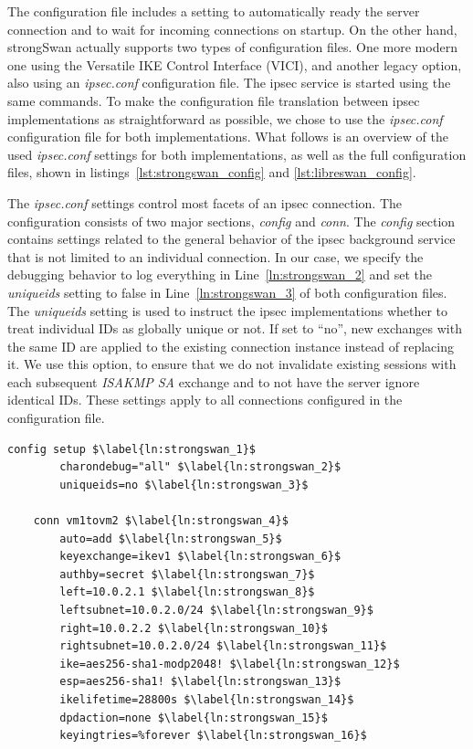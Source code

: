 The configuration file includes a setting to automatically ready the server connection and to wait for incoming connections on startup. On the other hand, strongSwan actually supports two types of configuration files. One more modern one using the Versatile IKE Control Interface (VICI), and another legacy option, also using an \emph{ipsec.conf} configuration file. The \ac{ipsec} service is started using the same commands. To make the configuration file translation between \ac{ipsec} implementations as straightforward as possible, we chose to use the \emph{ipsec.conf} configuration file for both implementations. What follows is an overview of the used \emph{ipsec.conf} settings for both implementations, as well as the full configuration files, shown in listings~\ref{lst:strongswan_config} and \ref{lst:libreswan_config}.

The \emph{ipsec.conf} settings control most facets of an \ac{ipsec} connection. The configuration consists of two major sections, \emph{config} and \emph{conn}. The \emph{config} section contains settings related to the general behavior of the \ac{ipsec} background service that is not limited to an individual connection. In our case, we specify the debugging behavior to log everything in Line~\ref{ln:strongswan_2} and set the \emph{uniqueids} setting to false in Line~\ref{ln:strongswan_3} of both configuration files. The \emph{uniqueids} setting is used to instruct the \ac{ipsec} implementations whether to treat individual IDs as globally unique or not. If set to ``no'', new exchanges with the same ID are applied to the existing connection instance instead of replacing it. We use this option, to ensure that we do not invalidate existing sessions with each subsequent \emph{ISAKMP SA} exchange and to not have the server ignore identical IDs. These settings apply to all connections configured in the configuration file.

\begin{lstlisting}[mathescape=true, float=ht, caption=strongSwan configuration, label=lst:strongswan_config]
	config setup $\label{ln:strongswan_1}$
		charondebug="all" $\label{ln:strongswan_2}$
		uniqueids=no $\label{ln:strongswan_3}$
	
	conn vm1tovm2 $\label{ln:strongswan_4}$
		auto=add $\label{ln:strongswan_5}$
		keyexchange=ikev1 $\label{ln:strongswan_6}$
		authby=secret $\label{ln:strongswan_7}$
		left=10.0.2.1 $\label{ln:strongswan_8}$
		leftsubnet=10.0.2.0/24 $\label{ln:strongswan_9}$
		right=10.0.2.2 $\label{ln:strongswan_10}$
		rightsubnet=10.0.2.0/24 $\label{ln:strongswan_11}$
		ike=aes256-sha1-modp2048! $\label{ln:strongswan_12}$
		esp=aes256-sha1! $\label{ln:strongswan_13}$
		ikelifetime=28800s $\label{ln:strongswan_14}$
		dpdaction=none $\label{ln:strongswan_15}$
		keyingtries=%forever $\label{ln:strongswan_16}$
\end{lstlisting}


